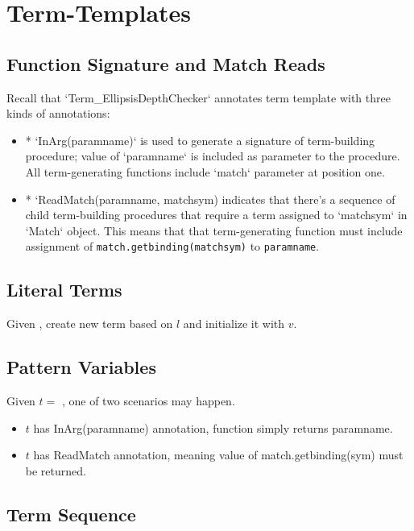 \section{Term-Templates}

\subsection{Function Signature and Match Reads}

Recall that `Term\_EllipsisDepthChecker` annotates term template with three kinds of annotations:
\begin{itemize}
\item
* `InArg(paramname)` is used to generate a signature of term-building procedure; value of `paramname` is included as parameter to the procedure. All term-generating functions include `match` parameter at position one.

\item
* `ReadMatch(paramname, matchsym) indicates that there's a sequence of child term-building procedures that require a term assigned to `matchsym` in `Match` object. This means that that term-generating function must include assignment of \texttt{match.getbinding(matchsym)} to \texttt{paramname}.

\end{itemize}

\subsection{Literal Terms}

Given \TermLiteral, create new term based on $l$ and initialize it with $v$.


\subsection{Pattern Variables}

Given $t =$ \PatternVariable, one of two scenarios may happen. 
\begin{itemize}
\item $t$ has InArg(paramname) annotation, function simply returns paramname.
\item $t$ has ReadMatch annotation, meaning value of match.getbinding(sym) must be returned.
\end{itemize}

\subsection{Term Sequence}

